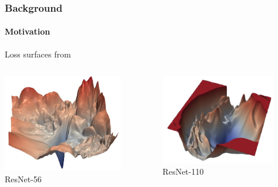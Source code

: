 \documentclass[10pt,aspectratio=169]{beamer}
\begin{document}
    \begin{frame}
        \frametitle{Background}
        \framesubtitle{Motivation}
        Loss surfaces from \cite{li2018visualizing}
        \begin{columns}
            \begin{column}{0.5\textwidth}
                \includegraphics[width=0.8\textwidth]{graphics/Loss_surface_resnet-56.jpg}
                ResNet-56
            \end{column}
            \begin{column}{0.5\textwidth}
                \includegraphics[width=0.8\textwidth]{graphics/Loss_surface_restnet-110.jpg}
                ResNet-110
            \end{column}
        \end{columns}
    \end{frame}
\end{document}
